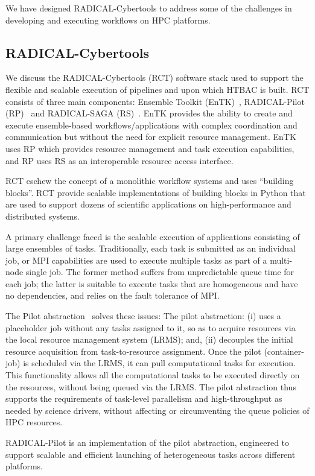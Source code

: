 
We have designed RADICAL-Cybertools to address some of the challenges in
developing and executing workflows on HPC platforms. 

\subsection{RADICAL-Cybertools}

We discuss the RADICAL-Cybertools (RCT) software stack used to support the
flexible and scalable execution of pipelines and upon which HTBAC is built.
RCT consists of three main components: Ensemble Toolkit
(EnTK)~\cite{balasubramanian2016ensemble}, RADICAL-Pilot
(RP)~\cite{merzky2015radical} and RADICAL-SAGA (RS)~\cite{saga-x}. EnTK
provides the ability to create and execute ensemble-based
workflows/applications with complex coordination and communication but
without the need for explicit resource management. EnTK uses RP which
provides resource management and task execution capabilities, and RP uses RS
as an interoperable resource access  interface. %

RCT eschew the concept of a monolithic workflow systems and uses ``building
blocks''. RCT provide scalable implementations of building blocks in Python
that are used to support dozens of scientific applications on high-performance
and distributed systems. 



A primary challenge faced is the scalable execution of applications
consisting of large ensembles of tasks.  Traditionally, each task is
submitted as an individual job, or MPI capabilities are used to  execute
multiple tasks as part of a multi-node single job. The former method suffers
from unpredictable queue time for each job; the latter is suitable to execute
tasks that are homogeneous and have no dependencies, and relies on the fault
tolerance of MPI\@.

The Pilot abstraction~\cite{turilli2017comprehensive} solves these issues:
The pilot abstraction: (i) uses a placeholder job without any tasks assigned
to it, so as to acquire resources via the local resource management system
(LRMS); and, (ii) decouples the initial resource acquisition from
task-to-resource assignment. Once the pilot (container-job) is scheduled via
the LRMS, it can pull computational tasks for execution. This functionality
allows all the computational tasks to be executed directly on the resources,
without being queued via the LRMS\@. %
The pilot abstraction thus supports the requirements of task-level
parallelism and high-throughput as needed by science drivers, without
affecting or circumventing the queue policies of HPC resources.

RADICAL-Pilot is an implementation of the pilot abstraction, engineered to
support scalable and efficient launching of heterogeneous tasks across
different platforms.
